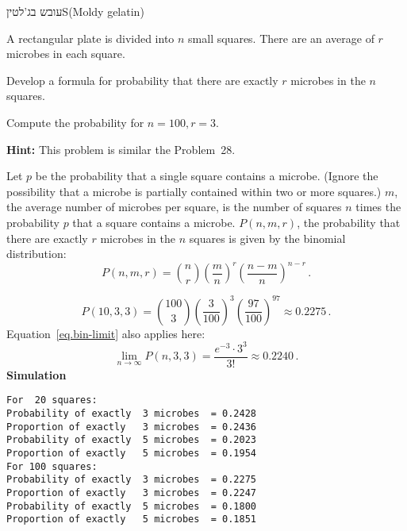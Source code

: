 
\begin{prob}{\protect עובש בג'לטין}{S}{(Moldy gelatin)}

A rectangular plate is divided into $n$ small squares. There are an average of $r$ microbes in each square.

 Develop a formula for probability that there are exactly $r$ microbes in the $n$ squares.

 Compute the probability for $n=100,r=3$.

\textbf{Hint:} This problem is similar the Problem~28.

\end{prob}

\solution{}

Let $p$ be the probability that a single square contains a microbe. (Ignore the possibility that a microbe is partially contained within two or more squares.) $m$, the average number of microbes per square, is the number of squares $n$ times the probability $p$ that a square contains a microbe. $P(n,m,r)$, the probability that there are exactly $r$ microbes in the $n$ squares is given by the binomial distribution:
\[
P(n,m,r) = {n \choose r} \left(\frac{m}{n}\right)^r \left(\frac{n-m}{n}\right)^{n-r}\,.
\]

\[
P(10,3,3) = {100 \choose 3} \left(\frac{3}{100}\right)^3 \left(\frac{97}{100}\right)^{97}\approx 0.2275\,.
\]
Equation~\ref{eq.bin-limit} also applies here:
\[
\lim_{n\rightarrow \infty} P(n,3,3) = \frac{e^{-3}\cdot 3^3}{3!}\approx 0.2240\,.
\]
\textbf{Simulation}
\begin{verbatim}
For  20 squares:
Probability of exactly  3 microbes  = 0.2428
Proportion of exactly   3 microbes  = 0.2436
Probability of exactly  5 microbes  = 0.2023
Proportion of exactly   5 microbes  = 0.1954
For 100 squares:
Probability of exactly  3 microbes  = 0.2275
Proportion of exactly   3 microbes  = 0.2247
Probability of exactly  5 microbes  = 0.1800
Proportion of exactly   5 microbes  = 0.1851
\end{verbatim}



